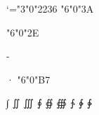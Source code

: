 \protected{}
\protected{}
\protected\def\smartdecimalcomma{\mathlet,\smartcomma}


\Umathcode`\:="3"0"2236 %
\Umathchardef\colon "6"0"3A

\Umathchardef\ldotp "6"0"2E
\let \period = \ldotp

\mathlet * \ast
\mathlet - \minus

\mathlet · \cdot
\Umathchardef\cdotp "6"0"B7

\protected{}

\let\neq  = \ne
\let\le   = \leq
\let\ge   = \geq
\let\owns = \ni
\let\gets = \leftarrow
\let\to   = \rightarrow
\let\land = \wedge
\let\lor  = \vee
\let\lnot = \neg

\protected{}
\protected{}
\protected{}
\protected{}
\protected{}
\protected{}

\let\widehat   = \hat
\let\widetilde = \tilde
\let\overline  = \overbar
\let\underline = \underbar

\let\intlimits=\nolimits

\explicitmathchar\intop
\explicitmathchar\iintop
\explicitmathchar\iiintop
\explicitmathchar\ointop
\explicitmathchar\oiintop
\explicitmathchar\oiiintop
\explicitmathchar\intclockwiseop
\explicitmathchar\varointclockwiseop
\explicitmathchar\ointctrclockwiseop

\edef\int              {\intop\intlimits}
\edef\iint             {\iintop\intlimits}
\edef\iiint            {\iiintop\intlimits}
\edef\oint             {\ointop\intlimits}
\edef\oiint            {\oiintop\intlimits}
\edef\oiiint           {\oiiintop\intlimits}
\edef\intclockwise     {\intclockwiseop\intlimits}
\edef\varointclockwise {\varointclockwiseop\intlimits}
\edef\ointctrclockwise {\ointctrclockwiseop\intlimits}

\mathlet ∫ \int
\mathlet ∬ \iint
\mathlet ∭ \iiint
\mathlet ∮ \oint
\mathlet ∯ \oiint
\mathlet ∰ \oiiint
\mathlet ∱ \intclockwise
\mathlet ∲ \varointclockwise
\mathlet ∳ \ointctrclockwise

